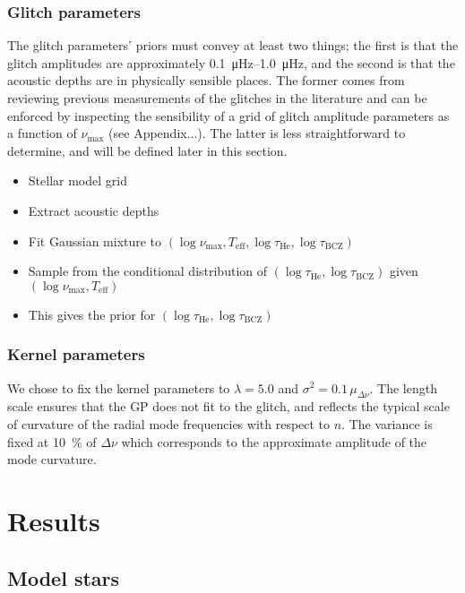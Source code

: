 \documentclass[linenumbers,modern]{aastex631}
\newcommand{\helium}{\mathrm{He}}
\newcommand{\bcz}{\mathrm{BCZ}}
\begin{document}
\subsubsection{Glitch parameters} \label{sec:glitch-params}

The glitch parameters' priors must convey at least two things; the first is
that the glitch amplitudes are approximately \SIrange{0.1}{1.0}{\micro\hertz}, 
and the second is that the acoustic depths are in physically sensible places.
The former comes from reviewing previous measurements of the glitches in the
literature and can be enforced by inspecting the sensibility of a grid of
glitch amplitude parameters as a function of \(\nu_\mathrm{max}\) (see
Appendix...). The latter is less straightforward to determine, and will be
defined later in this section.

\begin{itemize}
    \item Stellar model grid
    \item Extract acoustic depths
    \item Fit Gaussian mixture to \((\log\nu_\mathrm{max}, T_\mathrm{eff},
        \log\tau_\helium, \log\tau_\bcz)\)
    \item Sample from the conditional distribution of \((\log\tau_\helium,
        \log\tau_\bcz)\) given \((\log\nu_\mathrm{max}, T_\mathrm{eff})\)
    \item This gives the prior for \((\log\tau_\helium, \log\tau_\bcz)\)
\end{itemize}

\subsubsection{Kernel parameters} \label{sec:kernel-params}

We chose to fix the kernel parameters to \(\lambda = 5.0\) and \(\sigma^2 =
0.1 \, \mu_{\Delta\nu}\). The length scale ensures that the GP does not fit to
the glitch, and reflects the typical scale of curvature of the radial mode
frequencies with respect to \(n\). The variance is fixed at \SI{10}{\percent}
of \(\Delta\nu\) which corresponds to the approximate amplitude of the mode
curvature.

\section{Results} \label{sec:results}



\subsection{Model stars} \label{sec:model-stars}
\end{document}
